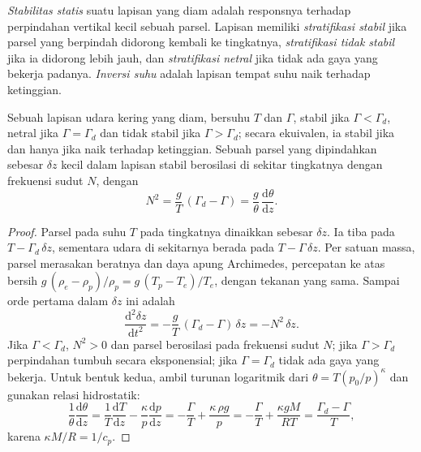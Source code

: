 \begin{definition}\label{def:b1:fluid-envelopes-structure:stability}
\emph{Stabilitas statis} suatu lapisan yang diam adalah responsnya terhadap perpindahan vertikal kecil sebuah parsel. Lapisan memiliki \emph{stratifikasi stabil} jika parsel yang berpindah didorong kembali ke tingkatnya, \emph{stratifikasi tidak stabil} jika ia didorong lebih jauh, dan \emph{stratifikasi netral} jika tidak ada gaya yang bekerja padanya. \emph{Inversi suhu} adalah lapisan tempat suhu naik terhadap ketinggian.
\end{definition}

\begin{theorem}\label{thm:b1:fluid-envelopes-structure:stability}
Sebuah lapisan udara kering yang diam, bersuhu $T$ dan  $\Gamma$, stabil jika $\Gamma < \Gamma_d$, netral jika $\Gamma = \Gamma_d$ dan tidak stabil jika $\Gamma > \Gamma_d$; secara ekuivalen, ia stabil jika dan hanya jika  naik terhadap ketinggian. Sebuah parsel yang dipindahkan sebesar $\delta z$ kecil dalam lapisan stabil berosilasi di sekitar tingkatnya dengan frekuensi sudut $N$, dengan
\[
  N^2 = \frac{g}{T}\,(\Gamma_d - \Gamma) = \frac{g}{\theta}\,\frac{\mathrm d\theta}{\mathrm dz}.
\]
\end{theorem}

\begin{proof}
Parsel pada suhu $T$ pada tingkatnya dinaikkan sebesar $\delta z$. Ia tiba pada $T - \Gamma_d\,\delta z$, sementara udara di sekitarnya berada pada $T - \Gamma\,\delta z$. Per satuan massa, parsel merasakan beratnya dan daya apung Archimedes, percepatan ke atas bersih $g\,(\rho_e - \rho_p)/\rho_p = g\,(T_p - T_e)/T_e$, dengan tekanan yang sama. Sampai orde pertama dalam $\delta z$ ini adalah
\[
  \frac{\mathrm d^2 \delta z}{\mathrm dt^2} = -\frac{g}{T}\,(\Gamma_d - \Gamma)\,\delta z = -N^2\,\delta z .
\]
Jika $\Gamma < \Gamma_d$, $N^2 > 0$ dan parsel berosilasi pada frekuensi sudut $N$; jika $\Gamma > \Gamma_d$ perpindahan tumbuh secara eksponensial; jika $\Gamma = \Gamma_d$ tidak ada gaya yang bekerja. Untuk bentuk kedua, ambil turunan logaritmik dari $\theta = T (p_0/p)^{\kappa}$ dan gunakan relasi hidrostatik:
\[
  \frac{1}{\theta}\frac{\mathrm d\theta}{\mathrm dz} = \frac{1}{T}\frac{\mathrm dT}{\mathrm dz}
  - \frac{\kappa}{p}\frac{\mathrm dp}{\mathrm dz} = -\frac{\Gamma}{T} + \frac{\kappa\,\rho g}{p}
  = -\frac{\Gamma}{T} + \frac{\kappa g M}{RT} = \frac{\Gamma_d - \Gamma}{T},
\]
karena $\kappa M/R = 1/c_p$.
\end{proof}

